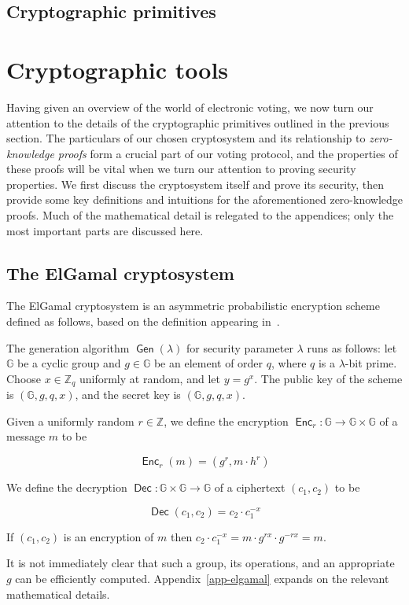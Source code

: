 \documentclass[12pt,a4paper]{article}
\DeclareMathOperator{\Gen}{\mathsf{Gen}}
\DeclareMathOperator{\Enc}{\mathsf{Enc}}
\DeclareMathOperator{\Dec}{\mathsf{Dec}}
\theoremstyle{definition}
\begin{document}
\subsection{Cryptographic primitives}

\section{Cryptographic tools}\label{sec-crypto}
Having given an overview of the world of electronic voting, we now turn our attention to the details of the cryptographic primitives outlined in the previous section. The particulars of our chosen cryptosystem and its relationship to \textit{zero-knowledge proofs} form a crucial part of our voting protocol, and the properties of these proofs will be vital when we turn our attention to proving security properties. We first discuss the cryptosystem itself and prove its security, then provide some key definitions and intuitions for the aforementioned zero-knowledge proofs. Much of the mathematical detail is relegated to the appendices; only the most important parts are discussed here.
\subsection{The ElGamal cryptosystem}
The ElGamal cryptosystem is an asymmetric probabilistic encryption scheme defined as follows, based on the definition appearing in~\cite{katz2014introduction}.
\begin{definition}\label{def-elgamal}
    The generation algorithm $\Gen(\lambda)$ for security parameter $\lambda$ runs as follows: let $\mathbb{G}$ be a cyclic group and $g\in\mathbb{G}$ be an element of order $q$, where $q$ is a $\lambda$-bit prime. Choose $x\in\mathbb{Z}_q$ uniformly at random, and let $y=g^x$. The public key of the scheme is $(\mathbb{G}, g, q, x)$, and the secret key is $(\mathbb{G}, g, q, x)$.

    Given a uniformly random $r\in\mathbb{Z}$, we define the encryption $\Enc_r:\mathbb{G}\rightarrow\mathbb{G}\times\mathbb{G}$ of a message $m$ to be
    
    $$\Enc_r(m) = (g^r, m\cdot h^r)$$

    We define the decryption $\Dec:\mathbb{G}\times\mathbb{G}\rightarrow \mathbb{G}$ of a ciphertext $(c_1, c_2)$ to be
    
    $$\Dec(c_1,c_2)=c_2\cdot c_1^{-x}$$

    If $(c_1,c_2)$ is an encryption of $m$ then $c_2\cdot c_1^{-x}=m\cdot g^{rx}\cdot g^{-rx}=m$.
\end{definition}
It is not immediately clear that such a group, its operations, and an appropriate $g$ can be efficiently computed. Appendix~\ref{app-elgamal} expands on the relevant mathematical details.
\end{document}
